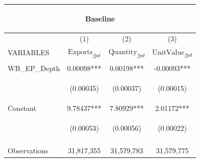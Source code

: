 \documentclass[]{article}
\begin{document}
\begin{center}
\begin{tabular}{lccc}
\multicolumn{4}{c}{\begin{large}Baseline\end{large}} \\ \hline
 & (1) & (2) & (3) \\
VARIABLES & $\text{Exports}_{fpd}$ & $\text{Quantity}_{fpd}$ & $\text{UnitValue}_{fpd}$ \\ \hline
\vspace{4pt} & \begin{footnotesize}\end{footnotesize} & \begin{footnotesize}\end{footnotesize} & \begin{footnotesize}\end{footnotesize} \\
WB\_EP\_Depth & 0.00098*** & 0.00198*** & -0.00093*** \\
\vspace{4pt} & \begin{footnotesize}(0.00035)\end{footnotesize} & \begin{footnotesize}(0.00037)\end{footnotesize} & \begin{footnotesize}(0.00015)\end{footnotesize} \\
Constant & 9.78437*** & 7.80929*** & 2.01172*** \\
 & \begin{footnotesize}(0.00053)\end{footnotesize} & \begin{footnotesize}(0.00056)\end{footnotesize} & \begin{footnotesize}(0.00022)\end{footnotesize} \\
\vspace{4pt} & \begin{footnotesize}\end{footnotesize} & \begin{footnotesize}\end{footnotesize} & \begin{footnotesize}\end{footnotesize} \\
Observations & 31,817,355 & 31,579,783 & 31,579,775 \\

\end{tabular}
\end{center}
\end{document}
